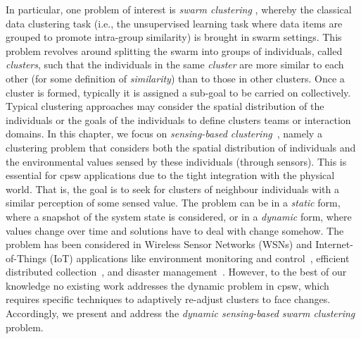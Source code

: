 In particular, one problem of interest is \emph{swarm clustering} \cite{DBLP:conf/smc/LeeKK05,DBLP:journals/asc/CruzNM17},
 whereby the classical data clustering task
 (i.e., the unsupervised learning task where data items are grouped to promote intra-group similarity)
 is brought in swarm settings.
%
This problem revolves around splitting the swarm
 into groups of individuals, called \emph{clusters},
 such that the individuals in the same \emph{cluster}
 are more similar to each other (for some definition of \emph{similarity}) than to those in other clusters.
%
Once a cluster is formed, typically it is assigned a sub-goal to be carried on collectively.
%
Typical clustering approaches may consider
 the spatial distribution of the individuals
 or the goals of the individuals to define clusters
  teams or interaction domains.
%
In this chapter, 
 we focus on \emph{sensing-based clustering}~\cite{DBLP:conf/ccnc/LinM07}, namely
 a clustering problem
 that considers both the spatial distribution of individuals
 and the environmental values sensed by these individuals (through sensors).
 This is essential for \ac{cpsw} applications due to the tight integration with the physical world.
%
That is, the goal is to seek for clusters of neighbour individuals with a similar perception of some sensed value.
%
The problem can be in a \emph{static} form,
 where a snapshot of the system state is considered,
 or in a \emph{dynamic} form,
 where values change over time
 and solutions have to deal with change somehow.
%
The problem has been considered in Wireless Sensor Networks (WSNs) and Internet-of-Things (IoT) applications like
  environment monitoring and control~\cite{DBLP:conf/ccnc/LinM07},
  efficient distributed collection~\cite{DBLP:journals/ijcomsys/PhamLPC10},
  and disaster management~\cite{DBLP:journals/jaihc/KucukBSK20}.
%
However, to the best of our knowledge no existing work addresses the dynamic problem in \ac{cpsw}, which requires specific
techniques to adaptively re-adjust clusters to face changes.
%
%
Accordingly, we present and address the \emph{dynamic sensing-based swarm clustering} problem.
%

